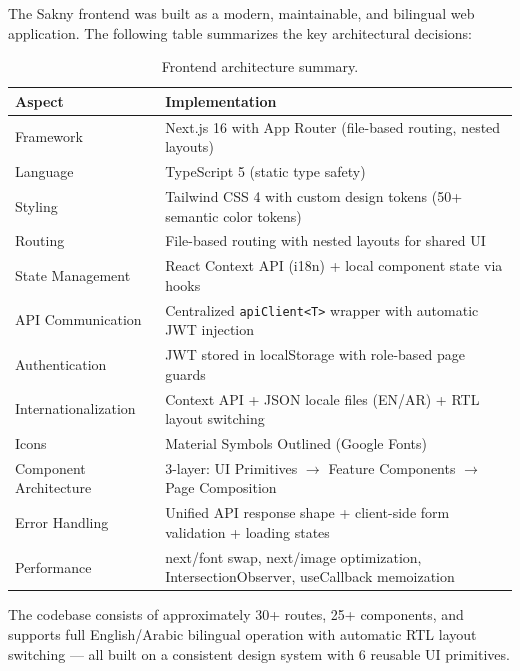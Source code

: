 \documentclass[12pt,a4paper]{article}
\begin{document}
The Sakny frontend was built as a modern, maintainable, and bilingual web application. The following table summarizes the key architectural decisions:

\begin{table}[H]
\centering
\begin{tabular}{@{}lp{8.5cm}@{}}
\toprule
\textbf{Aspect} & \textbf{Implementation} \\
\midrule
Framework & Next.js 16 with App Router (file-based routing, nested layouts) \\
Language & TypeScript 5 (static type safety) \\
Styling & Tailwind CSS 4 with custom design tokens (50+ semantic color tokens) \\
Routing & File-based routing with nested layouts for shared UI \\
State Management & React Context API (i18n) + local component state via hooks \\
API Communication & Centralized \texttt{apiClient<T>} wrapper with automatic JWT injection \\
Authentication & JWT stored in localStorage with role-based page guards \\
Internationalization & Context API + JSON locale files (EN/AR) + RTL layout switching \\
Icons & Material Symbols Outlined (Google Fonts) \\
Component Architecture & 3-layer: UI Primitives $\rightarrow$ Feature Components $\rightarrow$ Page Composition \\
Error Handling & Unified API response shape + client-side form validation + loading states \\
Performance & next/font swap, next/image optimization, IntersectionObserver, useCallback memoization \\
\bottomrule
\end{tabular}
\caption{Frontend architecture summary.}
\end{table}

The codebase consists of approximately 30+ routes, 25+ components, and supports full English/Arabic bilingual operation with automatic RTL layout switching — all built on a consistent design system with 6 reusable UI primitives.
\end{document}
